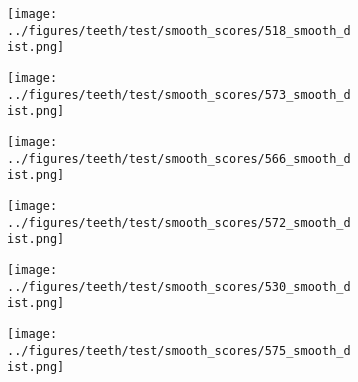 \begin{figure}[h!]
\begin{subfigure}{0.16\textwidth}
			\texttt{[image: ../figures/teeth/test/smooth\_scores/518\_smooth\_dist.png]}
			\label{fig:1}
		\end{subfigure}
	\begin{subfigure}{0.16\textwidth}
			\centering
			\texttt{[image: ../figures/teeth/test/smooth\_scores/573\_smooth\_dist.png]}
			\label{fig:1}
		\end{subfigure}
	\begin{subfigure}{0.16\textwidth}
			\centering
			\texttt{[image: ../figures/teeth/test/smooth\_scores/566\_smooth\_dist.png]}
			\label{fig:1}
		\end{subfigure}
	\begin{subfigure}{0.16\textwidth}
			\centering
			\texttt{[image: ../figures/teeth/test/smooth\_scores/572\_smooth\_dist.png]}
			\label{fig:1}
		\end{subfigure}
	\begin{subfigure}{0.16\textwidth}
			\centering
			\texttt{[image: ../figures/teeth/test/smooth\_scores/530\_smooth\_dist.png]}
			\label{fig:1}
		\end{subfigure}
	\begin{subfigure}{0.16\textwidth}
			\centering
			\texttt{[image: ../figures/teeth/test/smooth\_scores/575\_smooth\_dist.png]}
			\label{fig:1}
		\end{subfigure}
		\vspace{-0.5cm}
	\caption{}\label{fig:teeth}
\end{figure}